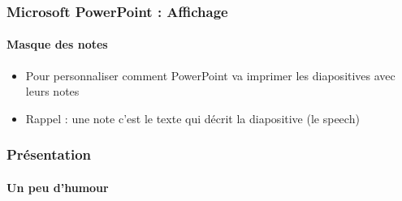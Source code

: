 \documentclass[xcolor=table, usenames,dvipsnames]{beamer}
\begin{document}
\begin{frame}[t]
\frametitle{Microsoft PowerPoint : Affichage}
\framesubtitle{Masque des notes}


\begin{minipage}{0.70\textwidth}
	\begin{itemize}
		\item Pour personnaliser comment PowerPoint va imprimer les diapositives avec leurs notes
		\item Rappel : une note c'est le texte qui décrit la diapositive (le speech)
	\end{itemize}
\end{minipage}
%
\begin{minipage}{0.29\textwidth}
\end{minipage}

\end{frame}


\begin{frame}
\frametitle{Présentation}
\framesubtitle{Un peu d'humour}

\begin{center}
\end{center}

\end{frame}

\end{document}
